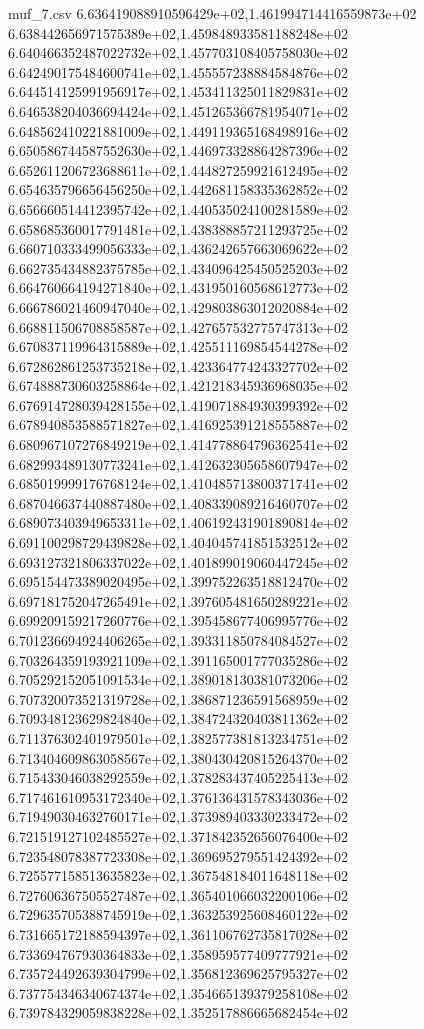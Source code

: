 \begin{filecontents*}{muf_7.csv}
6.636419088910596429e+02,1.461994714416559873e+02
6.638442656971575389e+02,1.459848933581188248e+02
6.640466352487022732e+02,1.457703108405758030e+02
6.642490175484600741e+02,1.455557238884584876e+02
6.644514125991956917e+02,1.453411325011829831e+02
6.646538204036694424e+02,1.451265366781954071e+02
6.648562410221881009e+02,1.449119365168498916e+02
6.650586744587552630e+02,1.446973328864287396e+02
6.652611206723688611e+02,1.444827259921612495e+02
6.654635796656456250e+02,1.442681158335362852e+02
6.656660514412395742e+02,1.440535024100281589e+02
6.658685360017791481e+02,1.438388857211293725e+02
6.660710333499056333e+02,1.436242657663069622e+02
6.662735434882375785e+02,1.434096425450525203e+02
6.664760664194271840e+02,1.431950160568612773e+02
6.666786021460947040e+02,1.429803863012020884e+02
6.668811506708858587e+02,1.427657532775747313e+02
6.670837119964315889e+02,1.425511169854544278e+02
6.672862861253735218e+02,1.423364774243327702e+02
6.674888730603258864e+02,1.421218345936968035e+02
6.676914728039428155e+02,1.419071884930399392e+02
6.678940853588571827e+02,1.416925391218555887e+02
6.680967107276849219e+02,1.414778864796362541e+02
6.682993489130773241e+02,1.412632305658607947e+02
6.685019999176768124e+02,1.410485713800371741e+02
6.687046637440887480e+02,1.408339089216460707e+02
6.689073403949653311e+02,1.406192431901890814e+02
6.691100298729439828e+02,1.404045741851532512e+02
6.693127321806337022e+02,1.401899019060447245e+02
6.695154473389020495e+02,1.399752263518812470e+02
6.697181752047265491e+02,1.397605481650289221e+02
6.699209159217260776e+02,1.395458677406995776e+02
6.701236694924406265e+02,1.393311850784084527e+02
6.703264359193921109e+02,1.391165001777035286e+02
6.705292152051091534e+02,1.389018130381073206e+02
6.707320073521319728e+02,1.386871236591568959e+02
6.709348123629824840e+02,1.384724320403811362e+02
6.711376302401979501e+02,1.382577381813234751e+02
6.713404609863058567e+02,1.380430420815264370e+02
6.715433046038292559e+02,1.378283437405225413e+02
6.717461610953172340e+02,1.376136431578343036e+02
6.719490304632760171e+02,1.373989403330233472e+02
6.721519127102485527e+02,1.371842352656076400e+02
6.723548078387723308e+02,1.369695279551424392e+02
6.725577158513635823e+02,1.367548184011648118e+02
6.727606367505527487e+02,1.365401066032200106e+02
6.729635705388745919e+02,1.363253925608460122e+02
6.731665172188594397e+02,1.361106762735817028e+02
6.733694767930364833e+02,1.358959577409777921e+02
6.735724492639304799e+02,1.356812369625795327e+02
6.737754346340674374e+02,1.354665139379258108e+02
6.739784329059838228e+02,1.352517886665682454e+02

\end{filecontents*}
